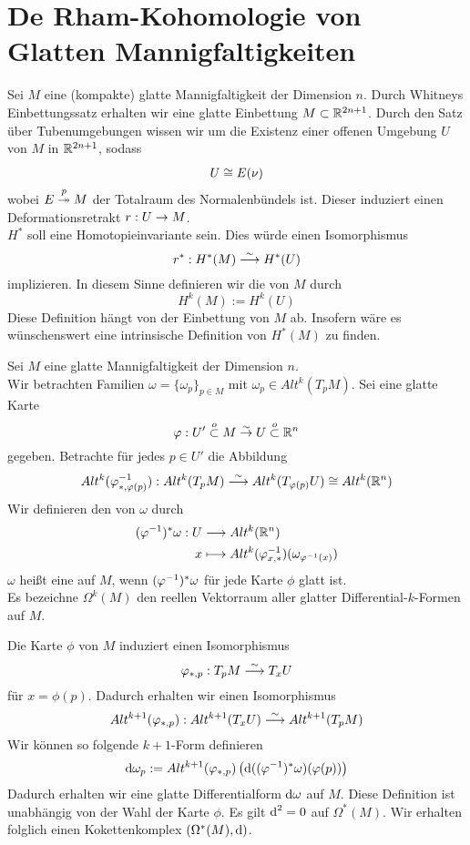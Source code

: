 \section{De Rham-Kohomologie von Glatten Mannigfaltigkeiten}
\Def{}
Sei $M$ eine (kompakte) glatte Mannigfaltigkeit der Dimension $n$. Durch Whitneys Einbettungssatz erhalten wir eine glatte Einbettung $M \subset \mathbb{R}^{2n+1}$. Durch den Satz über Tubenumgebungen wissen wir um die Existenz einer offenen Umgebung $U$ von $M$ in $\mathbb{R}^{2n+1}$, sodass
\[ U \overset{}{\cong} E(\nu) \]
wobei $E \overset{p}{\twoheadrightarrow} M $ der Totalraum des Normalenbündels ist. Dieser induziert einen Deformationsretrakt $r : U \overset{}{\rightarrow} M$.\\
$H^*$ soll eine Homotopieinvariante sein. Dies würde einen Isomorphismus
\[ r^* : H^*(M) \overset{\sim}{\longrightarrow} H^*(U) \]
implizieren. In diesem Sinne definieren wir die  von $M$ durch
\[ H^k(M) := H^k(U) \]
Diese Definition hängt von der Einbettung von $M$ ab. Insofern wäre es wünschenswert eine intrinsische Definition von $H^*(M)$ zu finden.

\Def{}
Sei $M$ eine glatte Mannigfaltigkeit der Dimension $n$.\\
Wir betrachten Familien $\omega = \{ \omega_p\}_{p\in M}$ mit $\omega_p \in Alt^k(T_pM)$. Sei eine glatte Karte 
\[\varphi : U' \overset{o}{\subset} M \overset{\sim}{\rightarrow} U \overset{o}{\subset} \mathbb{R}^n \]
gegeben. Betrachte für jedes $p \in U'$ die Abbildung
\[ Alt^k(\varphi^{-1}_{*,\varphi(p)}) : Alt^k(T_pM) \overset{\sim}{\longrightarrow} Alt^k(T_{\varphi(p)}U) \overset{}{\cong} Alt^k(\mathbb{R}^n) \]
Wir definieren den  von $\omega$ durch
\begin{align*}
(\varphi^{-1})^*\omega : U & \overset{}{\longrightarrow} Alt^k(\mathbb{R}^n)\\
x & \longmapsto Alt^k(\varphi^{-1}_{x,*})(\omega_{\varphi^{-1}(x)})
\end{align*}
$\omega$ heißt eine  auf $M$, wenn $(\varphi^{-1})^*\omega$ für jede Karte $\phi$ glatt ist.\\
Es bezeichne $\Omega^k(M)$ den reellen Vektorraum aller glatter Differential-$k$-Formen auf $M$.

\Def{}
Die Karte $\phi$ von $M$ induziert einen Isomorphismus
\[ \varphi_{*,p} : T_pM \overset{\sim}{\longrightarrow} T_{x}U \]
für $x = \phi(p)$. Dadurch erhalten wir einen Isomorphismus
\[ Alt^{k+1} ( \varphi_{*,p}) : Alt^{k+1}(T_xU) \overset{\sim}{\longrightarrow} Alt^{k+1}(T_pM) \]
Wir können so folgende $k+1$-Form definieren
\[ \text{d} \omega_p:= Alt^{k+1}(\varphi_{*,p}) \left( \text{d} ((\varphi^{-1})^*\omega) (\varphi(p)) \right) \]
Dadurch erhalten wir eine glatte Differentialform $\text{d} \omega$ auf $M$. Diese Definition ist unabhängig von der Wahl der Karte $\phi$. Es gilt $\text{d}^2 = 0$ auf $\Omega^*(M)$. Wir erhalten folglich einen Kokettenkomplex $(\Omega^*(M), \text{d})$.


